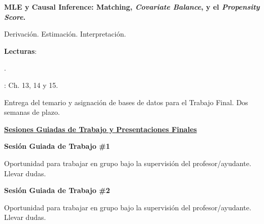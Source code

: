 \documentclass[letterpaper]{article}
\renewenvironment{itemize}{
  \begin{list}{}{
    \setlength{\leftmargin}{1.5em}
  }
}{
  \end{list}
}
\begin{document}
\begin{enumerate}[label=\roman*.]
       \begin{itemize} 
        \item[20.] {\bf MLE y Causal Inference: Matching, \emph{Covariate Balance}, y el \emph{Propensity Score}.}
        \begin{itemize} 
          \item[$\circ$] Derivaci\'on. Estimaci\'on. Interpretaci\'on.
          \item[$\circ$] {\bf Lecturas}: 
            \begin{itemize} 
              \item[$\diamond$] \href{https://github.com/hbahamonde/MLE/raw/master/Readings/King_Preprocessing.pdf}{\textcite{Ho2006}}.
              \item[$\diamond$] \textcite{Imbens2015}: Ch. 13, 14 y 15.
          \end{itemize}
        \end{itemize}
      \end{itemize}


\item[{\color{red}\Pointinghand}] Entrega del temario y asignaci\'on de bases de datos para el Trabajo Final. Dos semanas de plazo.


\item {\bf {\color{ForestGreen}\underline{Sesiones Guiadas de Trabajo y Presentaciones Finales}}}



     \begin{itemize} 
        \item[21.] {\bf Sesi\'on Guiada de Trabajo \#1}
        \begin{itemize} 
          \item[$\circ$] Oportunidad para trabajar en grupo bajo la supervisi\'on del profesor/ayudante. Llevar dudas.
        \end{itemize}
      \end{itemize}


       \begin{itemize} 
        \item[22.] {\bf Sesi\'on Guiada de Trabajo \#2}
        \begin{itemize} 
          \item[$\circ$] Oportunidad para trabajar en grupo bajo la supervisi\'on del profesor/ayudante. Llevar dudas.
        \end{itemize}
      \end{itemize}



\end{enumerate}
\end{document}
